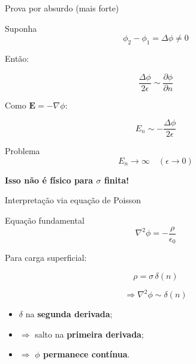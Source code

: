 \documentclass[aspectratio=169,11pt]{beamer}
\begin{document}
\begin{frame}{Prova por absurdo (mais forte)}
\begin{block}{Suponha}
\begin{equation}
\phi_2 - \phi_1 = \Delta \phi \neq 0
\end{equation}
\end{block}

\pause

Então:

\begin{equation}
\frac{\Delta \phi}{2\epsilon}
\sim \frac{\partial \phi}{\partial n}
\end{equation}

\pause

Como $\mathbf E = -\nabla \phi$:

\begin{equation}
E_n \sim -\frac{\Delta \phi}{2\epsilon}
\end{equation}

\pause

\begin{alertblock}{Problema}
\begin{equation}
E_n \to \infty \quad (\epsilon \to 0)
\end{equation}
\end{alertblock}

\pause

\begin{center}
\textbf{Isso não é físico para $\sigma$ finita!}
\end{center}
\end{frame}

\begin{frame}{Interpretação via equação de Poisson}
\begin{block}{Equação fundamental}
\begin{equation}
\nabla^2 \phi = -\frac{\rho}{\epsilon_0}
\end{equation}
\end{block}

\pause

Para carga superficial:

\begin{equation}
\rho = \sigma \, \delta(n)
\end{equation}

\pause

\begin{equation}
\Rightarrow \nabla^2 \phi \sim \delta(n)
\end{equation}

\pause

\begin{itemize}
\item $\delta$ na \textbf{segunda derivada};
\item $\Rightarrow$ salto na \textbf{primeira derivada};
\item $\Rightarrow$ \textbf{$\phi$ permanece contínua}.
\end{itemize}
\end{frame}
\end{document}
